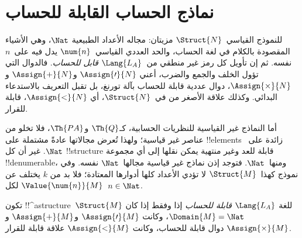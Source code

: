 \documentclass[../../../include/open-logic-section]{subfiles}
\begin{document}
\section{نماذج الحساب القابلة للحساب}

\begin{explain}
للنموذج القياسي~$\Struct{N}$ مزيتان: مجاله الأعداد الطبيعية
$\Nat$، وهي الأشياء المقصودة بالكلام في لغة الحساب، والحد
العددي القياسي~$\num{n}$ يدل فيه على~$n$ نفسه. ثم إن تأويل
كل رمز غير منطقي من~$\Lang{L_A}$ \emph{قابل للحساب}.
فالدوال التي تؤول الخلف والجمع والضرب، أعني
$\Assign{\prime}{N}$ و$\Assign{+}{N}$ و$\Assign{\times}{N}$،
دوال عددية قابلة للحساب بآلة تورنغ، بل تقبل التعريف
بالاستدعاء البدائي. وكذلك علاقة الأصغر من في~$\Struct{N}$،
أي $\Assign{<}{N}$، قابلة للقرار.

أما النماذج غير القياسية للنظريات الحسابية، كـ$\Th{Q}$
و$\Th{PA}$، فلا تخلو من عناصر غير قياسية؛ ولهذا تُعرض
مجالاتها عادةً مشتملة على !!{element}s زائدة على~$\Nat$.
غير أن كل !!{structure} قابلة للعد وغير منتهية يمكن نقلها
إلى أي مجموعة !!{denumerable}، ومنها~$\Nat$.
فتوجد إذن نماذج غير قياسية مجالها~$\Nat$ نفسه.
وفي نموذج كهذا~$\Struct{M}$ لا تؤدي الأعداد كلها أدوارها
المعتادة؛ فلا بد من $k$ يختلف عن $\Value{\num{n}}{M}$
لكل~$n \in \Nat$.
\end{explain}

\begin{defn}
تكون !!^a{structure}~$\Struct{M}$ للغة $\Lang{L_A}$ \emph{قابلة
للحساب} إذا وفقط إذا كان $\Domain{M}=\Nat$، وكانت
$\Assign{\prime}{M}$ و$\Assign{+}{M}$ و$\Assign{\times}{M}$ دوال قابلة
للحساب، وكانت $\Assign{<}{M}$ علاقة قابلة للقرار.
\end{defn}
\end{document}
